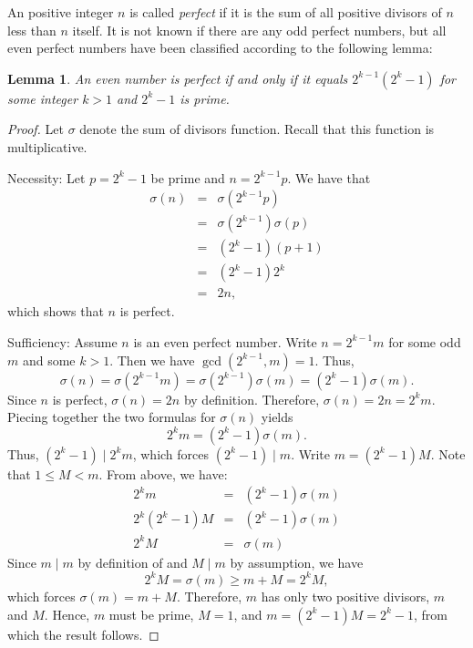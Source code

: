 \documentclass[12pt]{article}
\newtheorem{lemma*}{Lemma}
\begin{document}

An positive integer $n$ is called \emph{perfect} if it is the sum of all positive divisors of $n$ less than $n$ itself.  It is not known if there are any odd perfect numbers, but all even perfect numbers have been classified according to the following lemma:

\begin{lemma*}
An even number is perfect if and only if it equals $2^{k-1}(2^k-1)$ for some integer $k>1$ and $2^k-1$ is prime.\\
\end{lemma*}

\begin{proof}
Let $\sigma$ denote the sum of divisors function.  Recall that this function is multiplicative.

Necessity: Let $p=2^k-1$ be prime and $n=2^{k-1}p$.  We have that
\begin{eqnarray*}
\sigma(n) & = & \sigma(2^{k-1}p)\\
& = & \sigma(2^{k-1}) \sigma(p)\\
& = & (2^k-1)(p+1)\\
& = & (2^k-1)2^k\\
& = & 2n,
\end{eqnarray*}
which shows that $n$ is perfect.

Sufficiency: Assume $n$ is an even perfect number.  Write $n=2^{k-1}m$ for some odd $m$ and some $k>1$.  Then we have $\gcd(2^{k-1},m)=1$.  Thus,
\[ \sigma(n)=\sigma(2^{k-1}m)=\sigma(2^{k-1})\sigma(m)=(2^k-1)\sigma(m). \]
Since $n$ is perfect, $\sigma(n)=2n$ by definition.  Therefore, $\sigma(n)=2n=2^km$.  Piecing together the two formulas for $\sigma(n)$ yields
\[ 2^km=(2^k-1)\sigma(m). \]
Thus, $(2^k-1)\mid 2^km$, which forces $(2^k-1)\mid m$.  Write $m=(2^k-1)M$.  Note that $1\le M<m$.  From above, we have:
\begin{eqnarray*}
2^km & = & (2^k-1)\sigma(m) \\
2^k(2^k-1)M & = & (2^k-1)\sigma(m) \\
2^kM & = & \sigma(m)
\end{eqnarray*}
Since $m\mid m$ by definition of  and $M\mid m$ by assumption, we have
\[ 2^kM=\sigma(m)\geq m+M=2^kM, \]
which forces $\sigma(m)=m+M$. Therefore, $m$ has only two positive divisors, $m$ and $M$.  Hence, $m$ must be prime, $M=1$, and $m=(2^k-1)M=2^k-1$, from which the result follows.
\end{proof}
\end{document}
